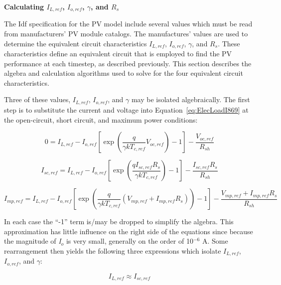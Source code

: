 \textbf{Calculating \(I_{L,ref}\), \(I_{o,ref}\), \(\gamma\), and \(R_{s}\)}

The Idf specification for the PV model include several values which must be read from manufacturers' PV module catalogs. The manufactures' values are used to determine the equivalent circuit characteristics \(I_{L,ref}\), \(I_{o,ref}\), \(\gamma\), and \(R_{s}\). These characteristics define an equivalent circuit that is employed to find the PV performance at each timestep, as described previously. This section describes the algebra and calculation algorithms used to solve for the four equivalent circuit characteristics.

Three of these values, \(I_{L,ref}\), \(I_{o,ref}\), and \(\gamma\) may be isolated algebraically. The first step is to substitute the current and voltage into Equation~\ref{eq:ElecLoadI869} at the open-circuit, short circuit, and maximum power conditions:

\begin{equation}
0 = {I_{L,ref}} - {I_{o,ref}}\left[ {\exp \left( {\frac{q}{{\gamma k{T_{c,ref}}}}{V_{oc,ref}}} \right) - 1} \right] - \frac{{{V_{oc,ref}}}}{{{R_{sh}}}}
\end{equation}

\begin{equation}
{I_{sc,ref}} = {I_{L,ref}} - {I_{o,ref}}\left[ {\exp \left( {\frac{{q{I_{sc,ref}}{R_s}}}{{\gamma k{T_{c,ref}}}}} \right) - 1} \right] - \frac{{{I_{sc,ref}}{R_s}}}{{{R_{sh}}}}
\end{equation}

\begin{equation}
{I_{mp,ref}} = {I_{L,ref}} - {I_{o,ref}}\left[ {\exp \left( {\frac{q}{{\gamma k{T_{c,ref}}}}\left( {{V_{mp,ref}} + {I_{mp,ref}}{R_s}} \right)} \right) - 1} \right] - \frac{{{V_{mp,ref}} + {I_{mp,ref}}{R_s}}}{{{R_{sh}}}}
\end{equation}

In each case the ``-1'' term is/may be dropped to simplify the algebra. This approximation has little influence on the right side of the equations since because the magnitude of \emph{I\(_{o}\)} is very small, generally on the order of 10\(^{-6}\) A. Some rearrangement then yields the following three expressions which isolate \(I_{L,ref}\), \(I_{o,ref}\), and \(\gamma\):

\begin{equation}
{I_{L,ref}} \approx {I_{sc,ref}}
\label{eq:ElecLoadILref875}
\end{equation}

